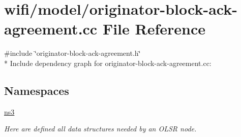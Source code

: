 \hypertarget{originator-block-ack-agreement_8cc}{}\section{wifi/model/originator-\/block-\/ack-\/agreement.cc File Reference}
\label{originator-block-ack-agreement_8cc}
{\ttfamily \#include \char`\"{}originator-\/block-\/ack-\/agreement.\+h\char`\"{}}\\*
Include dependency graph for originator-\/block-\/ack-\/agreement.cc\+:
\subsection*{Namespaces}
\begin{DoxyCompactItemize}
\item 
 \hyperlink{namespacens3}{ns3}
\begin{DoxyCompactList}\small\item\em Here are defined all data structures needed by an O\+L\+SR node. \end{DoxyCompactList}\end{DoxyCompactItemize}
